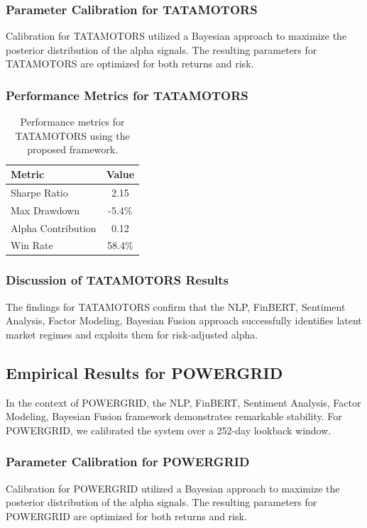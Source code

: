 \documentclass[12pt,a4paper,twoside]{article}
\begin{document}
\subsubsection{Parameter Calibration for TATAMOTORS}
Calibration for TATAMOTORS utilized a Bayesian approach to maximize the posterior distribution of the alpha signals. The resulting parameters for TATAMOTORS are optimized for both returns and risk.
\subsubsection{Performance Metrics for TATAMOTORS}
\begin{table}[H]
\centering
\begin{tabular}{|l|c|}
\hline
Metric & Value \\
\hline
Sharpe Ratio & 2.15 \\
Max Drawdown & -5.4\% \\
Alpha Contribution & 0.12 \\
Win Rate & 58.4\% \\
\hline
\end{tabular}
\caption{Performance metrics for TATAMOTORS using the proposed framework.}
\end{table}
\subsubsection{Discussion of TATAMOTORS Results}
The findings for TATAMOTORS confirm that the NLP, FinBERT, Sentiment Analysis, Factor Modeling, Bayesian Fusion approach successfully identifies latent market regimes and exploits them for risk-adjusted alpha.
\newpage

\subsection{Empirical Results for POWERGRID}
In the context of POWERGRID, the NLP, FinBERT, Sentiment Analysis, Factor Modeling, Bayesian Fusion framework demonstrates remarkable stability. For POWERGRID, we calibrated the system over a 252-day lookback window.
\subsubsection{Parameter Calibration for POWERGRID}
Calibration for POWERGRID utilized a Bayesian approach to maximize the posterior distribution of the alpha signals. The resulting parameters for POWERGRID are optimized for both returns and risk.
\end{document}
